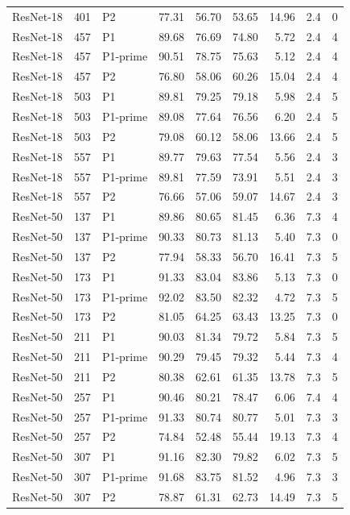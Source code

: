 {\begin{longtable}{lrlrrrrrr}
ResNet-18 & 401 & P2 & 77.31 & 56.70 & 53.65 & 14.96 & 2.4 & 0 \\
ResNet-18 & 457 & P1 & 89.68 & 76.69 & 74.80 & 5.72 & 2.4 & 4 \\
ResNet-18 & 457 & P1-prime & 90.51 & 78.75 & 75.63 & 5.12 & 2.4 & 4 \\
ResNet-18 & 457 & P2 & 76.80 & 58.06 & 60.26 & 15.04 & 2.4 & 4 \\
ResNet-18 & 503 & P1 & 89.81 & 79.25 & 79.18 & 5.98 & 2.4 & 5 \\
ResNet-18 & 503 & P1-prime & 89.08 & 77.64 & 76.56 & 6.20 & 2.4 & 5 \\
ResNet-18 & 503 & P2 & 79.08 & 60.12 & 58.06 & 13.66 & 2.4 & 5 \\
ResNet-18 & 557 & P1 & 89.77 & 79.63 & 77.54 & 5.56 & 2.4 & 3 \\
ResNet-18 & 557 & P1-prime & 89.81 & 77.59 & 73.91 & 5.51 & 2.4 & 3 \\
ResNet-18 & 557 & P2 & 76.66 & 57.06 & 59.07 & 14.67 & 2.4 & 3 \\
ResNet-50 & 137 & P1 & 89.86 & 80.65 & 81.45 & 6.36 & 7.3 & 4 \\
ResNet-50 & 137 & P1-prime & 90.33 & 80.73 & 81.13 & 5.40 & 7.3 & 0 \\
ResNet-50 & 137 & P2 & 77.94 & 58.33 & 56.70 & 16.41 & 7.3 & 5 \\
ResNet-50 & 173 & P1 & 91.33 & 83.04 & 83.86 & 5.13 & 7.3 & 0 \\
ResNet-50 & 173 & P1-prime & 92.02 & 83.50 & 82.32 & 4.72 & 7.3 & 5 \\
ResNet-50 & 173 & P2 & 81.05 & 64.25 & 63.43 & 13.25 & 7.3 & 0 \\
ResNet-50 & 211 & P1 & 90.03 & 81.34 & 79.72 & 5.84 & 7.3 & 5 \\
ResNet-50 & 211 & P1-prime & 90.29 & 79.45 & 79.32 & 5.44 & 7.3 & 4 \\
ResNet-50 & 211 & P2 & 80.38 & 62.61 & 61.35 & 13.78 & 7.3 & 5 \\
ResNet-50 & 257 & P1 & 90.46 & 80.21 & 78.47 & 6.06 & 7.4 & 4 \\
ResNet-50 & 257 & P1-prime & 91.33 & 80.74 & 80.77 & 5.01 & 7.3 & 3 \\
ResNet-50 & 257 & P2 & 74.84 & 52.48 & 55.44 & 19.13 & 7.3 & 4 \\
ResNet-50 & 307 & P1 & 91.16 & 82.30 & 79.82 & 6.02 & 7.3 & 5 \\
ResNet-50 & 307 & P1-prime & 91.68 & 83.75 & 81.52 & 4.96 & 7.3 & 3 \\
ResNet-50 & 307 & P2 & 78.87 & 61.31 & 62.73 & 14.49 & 7.3 & 5 \\

\end{longtable}}

